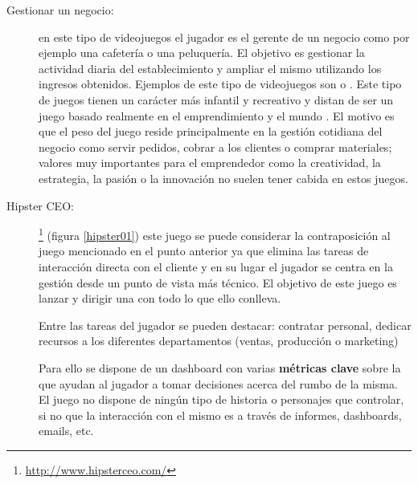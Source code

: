 \begin{description}
         \item[Gestionar un negocio:] en este tipo de videojuegos el jugador es el gerente de un negocio como por ejemplo una cafetería o una peluquería. El objetivo es gestionar la actividad diaria del establecimiento y ampliar el mismo utilizando los ingresos obtenidos. Ejemplos de este tipo de videojuegos son  o . Este tipo de juegos tienen un carácter más infantil y recreativo y distan de ser un juego basado realmente en el emprendimiento y el mundo . El motivo es que el peso del juego reside principalmente en la gestión cotidiana del negocio como servir pedidos, cobrar a los clientes o comprar materiales; valores muy importantes para el emprendedor como la creatividad, la estrategia, la pasión o la innovación no suelen tener cabida en estos juegos.
         

	\item[Hipster CEO:] \footnote{\url{http://www.hipsterceo.com/}} (figura \ref{hipster01}) este juego se puede considerar la contraposición al juego mencionado en el punto anterior ya que elimina las tareas de interacción directa con el cliente y en su lugar el jugador se centra en la gestión desde un punto de vista más técnico. El objetivo de este juego es lanzar y dirigir una  con todo lo que ello conlleva.
	
Entre las tareas del jugador se pueden destacar: contratar personal, dedicar recursos a los diferentes departamentos (ventas, producción o marketing) 

Para ello se dispone de un dashboard con varias \textbf{métricas clave} sobre la  que ayudan al jugador a tomar decisiones acerca del rumbo de la misma. El juego no dispone de ningún tipo de historia o personajes que controlar, si no que la interacción con el mismo es a través de informes, dashboards, emails, etc.


\end{description}
